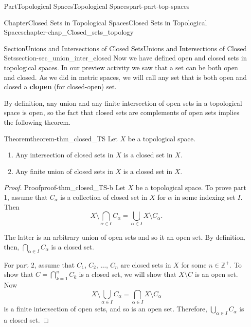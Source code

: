 \documentclass[oneside,10pt,]{book}
\newcommand{\terminology}[1]{\textbf{#1}}
\numberwithin{equation}{chapter}
\newcommand{\Z}{\mathbb{Z}}
\begin{document}
\begin{partptx}{Part}{Topological Spaces}{}{Topological Spaces}{}{}{part-part-top-spaces}
\begin{chapterptx}{Chapter}{Closed Sets in Topological Spaces}{}{Closed Sets in Topological Spaces}{}{}{chapter-chap_Closed_sets_topology}
%
%
\typeout{************************************************}
\typeout{************************************************}
%
\begin{sectionptx}{Section}{Unions and Intersections of Closed Sets}{}{Unions and Intersections of Closed Sets}{}{}{section-sec_union_inter_closed}
%
Now we have defined open and closed sets in topological spaces. In our preview activity we saw that a set can be both open and closed. As we did in metric spaces, we will call any set that is both open and closed a \terminology{clopen} (for closed-open) set.%
\par
By definition, any union and any finite intersection of open sets in a topological space is open, so the fact that closed sets are complements of open sets implies the following theorem.%
\begin{theorem}{Theorem}{}{}{theorem-thm_closed_TS}%
Let \(X\) be a topological space.%
\begin{enumerate}
\item{}Any intersection of closed sets in \(X\) is a closed set in \(X\).%
\item{}Any finite union of closed sets in \(X\) is a closed set in \(X\).%
\end{enumerate}
%
\end{theorem}
\begin{proof}{Proof}{}{proof-thm_closed_TS-b}
Let \(X\) be a topological space. To prove part 1, assume that \(C_{\alpha}\) is a collection of closed set in \(X\) for \(\alpha\) in some indexing set \(I\). Then%
\begin{equation*}
X \setminus \bigcap_{\alpha \in I} C_{\alpha} = \bigcup_{\alpha \in I} X \setminus C_{\alpha}\text{.}
\end{equation*}
%
\par
The latter is an arbitrary union of open sets and so it an open set. By definition, then, \(\bigcap_{\alpha \in I} C_{\alpha}\) is a closed set.%
\par
For part 2, assume that \(C_1\), \(C_2\), \(\ldots\), \(C_n\) are closed sets in \(X\) for some \(n \in \Z^+\). To show that \(C = \bigcap_{k=1}^n C_k\) is a closed set, we will show that \(X \setminus C\) is an open set. Now%
\begin{equation*}
X \setminus \bigcup_{\alpha \in I} C_{\alpha} = \bigcap_{\alpha \in I} X \setminus C_{\alpha}
\end{equation*}
is a finite intersection of open sets, and so is an open set. Therefore, \(\bigcup_{\alpha \in I} C_{\alpha}\) is a closed set.%

\end{proof}
\end{sectionptx}
\end{chapterptx}
\end{partptx}
\end{document}
